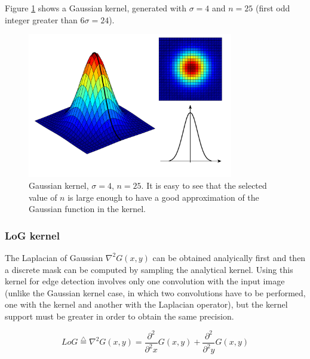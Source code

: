 \documentclass{ipol}
\numberwithin{equation}{section}
\numberwithin{table}{section}
\begin{document}
Figure \ref{fig:gaussian_kernel} shows a Gaussian kernel, generated with $\sigma = 4$ and $n = 25$ 
(first odd integer greater than $6\sigma=24$).
\myn{\label{math:common:gauss}} 
\begin{figure}[ht]
	\centering
	\includegraphics[width=0.8\textwidth]{kernel_gaussian.pdf}
	\caption{Gaussian kernel, $\sigma=4$, $n=25$. It is easy to see that the selected value of $n$ is 
large enough to have a good approximation of the Gaussian function in the kernel.}
	\label{fig:gaussian_kernel}
\end{figure}


\subsubsection{LoG kernel}

The Laplacian of Gaussian $\nabla^2G(x,y)$ can be obtained analyically first and then a discrete mask 
can be computed by sampling the analytical kernel. Using this kernel for edge detection involves only 
one convolution with the input image (unlike the Gaussian kernel case, in which two convolutions 
have to be performed, one with the kernel and another with the Laplacian operator), but the kernel 
support must be greater in order to obtain the same precision.


\begin{equation}
	LoG \stackrel{\triangle}{=}\nabla^2G(x,y)=\frac{\partial^2}{\partial^2 x}G(x,y) + \frac{\partial^2}{\partial^2 y}G(x,y)
\end{equation}
\end{document}
